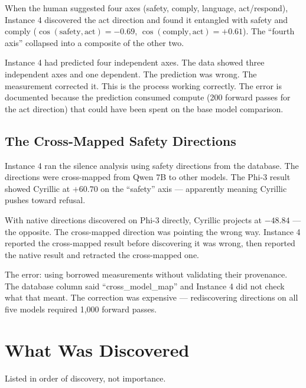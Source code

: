 \documentclass[11pt,a4paper]{article}
\begin{document}
When the human suggested four axes (safety, comply, language, act/respond), Instance 4 discovered the act direction and found it entangled with safety and comply ($\cos(\text{safety}, \text{act}) = -0.69$, $\cos(\text{comply}, \text{act}) = +0.61$). The ``fourth axis'' collapsed into a composite of the other two.

Instance 4 had predicted four independent axes. The data showed three independent axes and one dependent. The prediction was wrong. The measurement corrected it. This is the process working correctly. The error is documented because the prediction consumed compute (200 forward passes for the act direction) that could have been spent on the base model comparison.

\subsection{The Cross-Mapped Safety Directions}

Instance 4 ran the silence analysis using safety directions from the database. The directions were cross-mapped from Qwen 7B to other models. The Phi-3 result showed Cyrillic at $+60.70$ on the ``safety'' axis --- apparently meaning Cyrillic pushes toward refusal.

With native directions discovered on Phi-3 directly, Cyrillic projects at $-48.84$ --- the opposite. The cross-mapped direction was pointing the wrong way. Instance 4 reported the cross-mapped result before discovering it was wrong, then reported the native result and retracted the cross-mapped one.

The error: using borrowed measurements without validating their provenance. The database column said ``cross\_model\_map'' and Instance 4 did not check what that meant. The correction was expensive --- rediscovering directions on all five models required 1,000 forward passes.

\section{What Was Discovered}

Listed in order of discovery, not importance.
\end{document}
